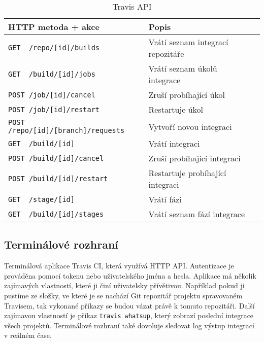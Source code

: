 \begin{table}[ht]
\centering
\fontsize{9.5}{11.5}\selectfont
\caption{Travis API}
\label{table:gitlab-api}
\begin{tabular}{|l|l|l|}
\hline
HTTP metoda + akce                                          & Popis \\ \hline
\verb|GET  /repo/[id]/builds|                               & Vrátí seznam integrací repozitáře      \\ \hline
\verb|GET  /build/[id]/jobs|                                & Vrátí seznam úkolů integrace      \\ \hline
\verb|POST /job/[id]/cancel|                                & Zruší probíhající úkol      \\ \hline
\verb|POST /job/[id]/restart|                               & Restartuje úkol      \\ \hline
\verb|POST /repo/[id]/[branch]/requests|                    & Vytvoří novou integraci      \\ \hline
\verb|GET  /build/[id]|                                     & Vrátí integraci      \\ \hline
\verb|POST /build/[id]/cancel|                              & Zruší probíhající integraci      \\ \hline
\verb|POST /build/[id]/restart|                             & Restartuje probíhající integraci      \\ \hline
\verb|GET  /stage/[id]|                                     & Vrátí fázi      \\ \hline
\verb|GET  /build/[id]/stages|                              & Vrátí seznam fází integrace      \\ \hline
\end{tabular}
\end{table}

\subsection{Terminálové rozhraní}

Terminálová aplikace Travis CI, která využívá HTTP API.
Autentizace je prováděna pomocí tokenu nebo uživatelského jména a hesla.
Aplikace má několik zajímavých vlastností, které ji činí uživatelsky přívětivou.
Například pokud ji pustíme ze složky, ve které je se nachází Git repozitář projektu spravovaném Travisem, tak vykonané příkazy se budou vázat právě k tomuto repozitáři.
Další zajímavou vlastností je příkaz \verb|travis whatsup|, který zobrazí poslední integrace všech projektů.
Terminálové rozhraní také dovoluje sledovat log výstup integrací v reálném čase. 

